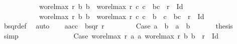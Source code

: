 \begin{isabellebody}
\ \ \ \ \ \ \ \ \ \ \ wo{\isacharunderscore}{\kern0pt}rel{\isachardot}{\kern0pt}max{}\ r\ b{}\ b{}\ {\isacharequal}{\kern0pt}\ wo{\isacharunderscore}{\kern0pt}rel{\isachardot}{\kern0pt}max{}\ r\ c{}\ c{}\ {\isasymand}\ {\isacharparenleft}{\kern0pt}b{}{\isacharcomma}{\kern0pt}c{}{\isacharparenright}{\kern0pt}\ {\isasymin}\ r\ {\isacharminus}{\kern0pt}\ Id\ {\isasymor}\isanewline
\ \ \ \ \ \ \ \ \ \ \ wo{\isacharunderscore}{\kern0pt}rel{\isachardot}{\kern0pt}max{}\ r\ b{}\ b{}\ {\isacharequal}{\kern0pt}\ wo{\isacharunderscore}{\kern0pt}rel{\isachardot}{\kern0pt}max{}\ r\ c{}\ c{}\ {\isasymand}\ b{}\ {\isacharequal}{\kern0pt}\ c{}\ {\isasymand}\ {\isacharparenleft}{\kern0pt}b{}{\isacharcomma}{\kern0pt}c{}{\isacharparenright}{\kern0pt}\ {\isasymin}\ r\ {\isacharminus}{\kern0pt}\ Id{\isachardoublequoteclose}\isanewline
\ \ \isamarkupfalse%
\ {\isacharasterisk}{\kern0pt}{\isacharasterisk}{\kern0pt}\ \isamarkupfalse%
\ bsqr{\isacharunderscore}{\kern0pt}def\ \isamarkupfalse%
\ auto\isanewline
\ \ \isamarkupfalse%
\ {\isachardoublequoteopen}{\isacharparenleft}{\kern0pt}{\isacharparenleft}{\kern0pt}a{}{\isacharcomma}{\kern0pt}a{}{\isacharparenright}{\kern0pt}{\isacharcomma}{\kern0pt}{\isacharparenleft}{\kern0pt}c{}{\isacharcomma}{\kern0pt}c{}{\isacharparenright}{\kern0pt}{\isacharparenright}{\kern0pt}\ {\isasymin}\ bsqr\ r{\isachardoublequoteclose}\isanewline
\ \ \isamarkupfalse%
{\isacharminus}{\kern0pt}\isanewline
\ \ \ \ \isacommand{{\isacharbraceleft}{\kern0pt}}\isamarkupfalse%
\isamarkupfalse%
\ Case{}{\isacharcolon}{\kern0pt}\ {\isachardoublequoteopen}a{}\ {\isacharequal}{\kern0pt}\ b{}\ {\isasymand}\ a{}\ {\isacharequal}{\kern0pt}\ b{}{\isachardoublequoteclose}\isanewline
\ \ \ \ \ \isamarkupfalse%
\ {\isacharquery}{\kern0pt}thesis\ \isamarkupfalse%
\ {\isacharasterisk}{\kern0pt}{\isacharasterisk}{\kern0pt}\ \isamarkupfalse%
\ simp\isanewline
\ \ \ \ \isacommand{{\isacharbraceright}{\kern0pt}}\isamarkupfalse%
\isanewline
\ \ \ \ \isamarkupfalse%
\isanewline
\ \ \ \ \isacommand{{\isacharbraceleft}{\kern0pt}}\isamarkupfalse%
\isamarkupfalse%
\ Case{}{\isacharcolon}{\kern0pt}\ {\isachardoublequoteopen}{\isacharparenleft}{\kern0pt}wo{\isacharunderscore}{\kern0pt}rel{\isachardot}{\kern0pt}max{}\ r\ a{}\ a{}{\isacharcomma}{\kern0pt}\ wo{\isacharunderscore}{\kern0pt}rel{\isachardot}{\kern0pt}max{}\ r\ b{}\ b{}{\isacharparenright}{\kern0pt}\ {\isasymin}\ r\ {\isacharminus}{\kern0pt}\ Id{\isachardoublequoteclose}\isanewline

\end{isabellebody}
